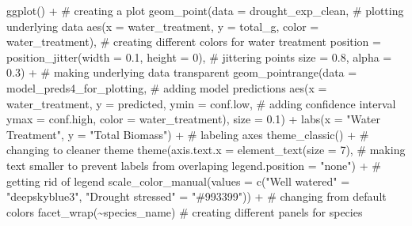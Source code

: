 \documentclass[
  letterpaper,
  DIV=11,
  numbers=noendperiod]{scrartcl}
\newenvironment{Shaded}{\begin{snugshade}}{\end{snugshade}}
\newcommand{\AttributeTok}[1]{\textcolor[rgb]{0.40,0.45,0.13}{#1}}
\newcommand{\CommentTok}[1]{\textcolor[rgb]{0.37,0.37,0.37}{#1}}
\newcommand{\DecValTok}[1]{\textcolor[rgb]{0.68,0.00,0.00}{#1}}
\newcommand{\FloatTok}[1]{\textcolor[rgb]{0.68,0.00,0.00}{#1}}
\newcommand{\FunctionTok}[1]{\textcolor[rgb]{0.28,0.35,0.67}{#1}}
\newcommand{\NormalTok}[1]{\textcolor[rgb]{0.00,0.23,0.31}{#1}}
\newcommand{\OtherTok}[1]{\textcolor[rgb]{0.00,0.23,0.31}{#1}}
\newcommand{\SpecialCharTok}[1]{\textcolor[rgb]{0.37,0.37,0.37}{#1}}
\newcommand{\StringTok}[1]{\textcolor[rgb]{0.13,0.47,0.30}{#1}}
\begin{document}
\begin{Shaded}
\begin{Highlighting}[]
\FunctionTok{ggplot}\NormalTok{() }\SpecialCharTok{+} \CommentTok{\# creating a plot}
  \FunctionTok{geom\_point}\NormalTok{(}\AttributeTok{data =}\NormalTok{ drought\_exp\_clean, }\CommentTok{\# plotting underlying data }
             \FunctionTok{aes}\NormalTok{(}\AttributeTok{x =}\NormalTok{ water\_treatment,}
                 \AttributeTok{y =}\NormalTok{ total\_g,}
                 \AttributeTok{color =}\NormalTok{ water\_treatment), }\CommentTok{\# creating different colors for water treatment}
             \AttributeTok{position =} \FunctionTok{position\_jitter}\NormalTok{(}\AttributeTok{width =} \FloatTok{0.1}\NormalTok{, }\AttributeTok{height =} \DecValTok{0}\NormalTok{), }\CommentTok{\# jittering points}
             \AttributeTok{size =} \FloatTok{0.8}\NormalTok{,}
             \AttributeTok{alpha =} \FloatTok{0.3}\NormalTok{) }\SpecialCharTok{+} \CommentTok{\# making underlying data transparent}
  \FunctionTok{geom\_pointrange}\NormalTok{(}\AttributeTok{data =}\NormalTok{ model\_preds4\_for\_plotting, }\CommentTok{\# adding model predictions}
              \FunctionTok{aes}\NormalTok{(}\AttributeTok{x =}\NormalTok{ water\_treatment,}
                  \AttributeTok{y =}\NormalTok{ predicted,}
                  \AttributeTok{ymin =}\NormalTok{ conf.low, }\CommentTok{\# adding confidence interval}
                  \AttributeTok{ymax =}\NormalTok{ conf.high,}
                  \AttributeTok{color =}\NormalTok{ water\_treatment),}
              \AttributeTok{size =} \FloatTok{0.1}\NormalTok{) }\SpecialCharTok{+}
  \FunctionTok{labs}\NormalTok{(}\AttributeTok{x =} \StringTok{"Water Treatment"}\NormalTok{, }\AttributeTok{y =} \StringTok{"Total Biomass"}\NormalTok{) }\SpecialCharTok{+} \CommentTok{\# labeling axes}
  \FunctionTok{theme\_classic}\NormalTok{() }\SpecialCharTok{+} \CommentTok{\# changing to cleaner theme}
  \FunctionTok{theme}\NormalTok{(}\AttributeTok{axis.text.x =} \FunctionTok{element\_text}\NormalTok{(}\AttributeTok{size =} \DecValTok{7}\NormalTok{), }\CommentTok{\# making text smaller to prevent labels from overlaping}
        \AttributeTok{legend.position =} \StringTok{"none"}\NormalTok{) }\SpecialCharTok{+} \CommentTok{\# getting rid of legend}
  \FunctionTok{scale\_color\_manual}\NormalTok{(}\AttributeTok{values =} \FunctionTok{c}\NormalTok{(}\StringTok{"Well watered"} \OtherTok{=} \StringTok{"deepskyblue3"}\NormalTok{, }\StringTok{"Drought stressed"} \OtherTok{=} \StringTok{"\#993399"}\NormalTok{)) }\SpecialCharTok{+} \CommentTok{\# changing from default colors}
  \FunctionTok{facet\_wrap}\NormalTok{(}\SpecialCharTok{\textasciitilde{}}\NormalTok{species\_name)  }\CommentTok{\# creating different panels for species}
\end{Highlighting}
\end{Shaded}
\end{document}
